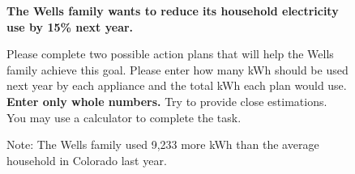 \documentclass{article}
\begin{document}
\begin{figure}[h]
\centering
{}
\bigskip

\textbf{The Wells family wants to reduce its household electricity use by 15\% next year.}

Please complete two possible action plans that will help the Wells family achieve this goal. Please enter how many kWh should be used next year by each appliance and the total kWh each plan would use. \textbf{Enter only whole numbers.} Try to provide close estimations. You may use a calculator to complete the task.

Note: The Wells family used 9,233 more kWh than the average household in Colorado last year.
\end{figure}
\end{document}

